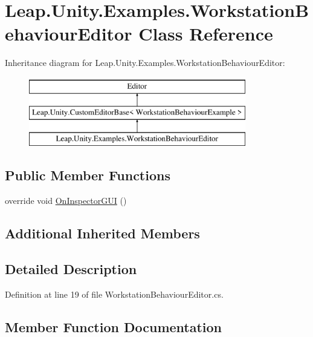 \hypertarget{class_leap_1_1_unity_1_1_examples_1_1_workstation_behaviour_editor}{}\section{Leap.\+Unity.\+Examples.\+Workstation\+Behaviour\+Editor Class Reference}
\label{class_leap_1_1_unity_1_1_examples_1_1_workstation_behaviour_editor}
Inheritance diagram for Leap.\+Unity.\+Examples.\+Workstation\+Behaviour\+Editor\+:\begin{figure}[H]
\begin{center}
\leavevmode
\includegraphics[height=3.000000cm]{class_leap_1_1_unity_1_1_examples_1_1_workstation_behaviour_editor}
\end{center}
\end{figure}
\subsection*{Public Member Functions}
\begin{DoxyCompactItemize}
\item 
override void \mbox{\hyperlink{class_leap_1_1_unity_1_1_examples_1_1_workstation_behaviour_editor_a1920661e5c2291403156bce841ed414c}{On\+Inspector\+G\+UI}} ()
\end{DoxyCompactItemize}
\subsection*{Additional Inherited Members}


\subsection{Detailed Description}


Definition at line 19 of file Workstation\+Behaviour\+Editor.\+cs.



\subsection{Member Function Documentation}
\mbox{\label{class_leap_1_1_unity_1_1_examples_1_1_workstation_behaviour_editor_a1920661e5c2291403156bce841ed414c}} 
